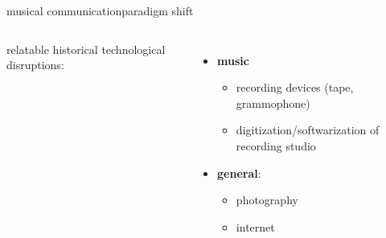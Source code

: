 \begin{frame}{musical communication}{paradigm shift}
    \vspace{-5mm}
    \begin{columns}
    
        relatable historical technological disruptions:
            \smallskip
                \begin{itemize}
                    \item \textbf{music}
                        \begin{itemize}
                            \item recording devices (tape, grammophone)
                            \item digitization/softwarization of recording studio
                        \end{itemize}
                    \bigskip
                    \item \textbf{general}:
                        \begin{itemize}
                            \item photography
                            \item internet
                        \end{itemize}
                \end{itemize}
    

\end{columns}
\end{frame}
